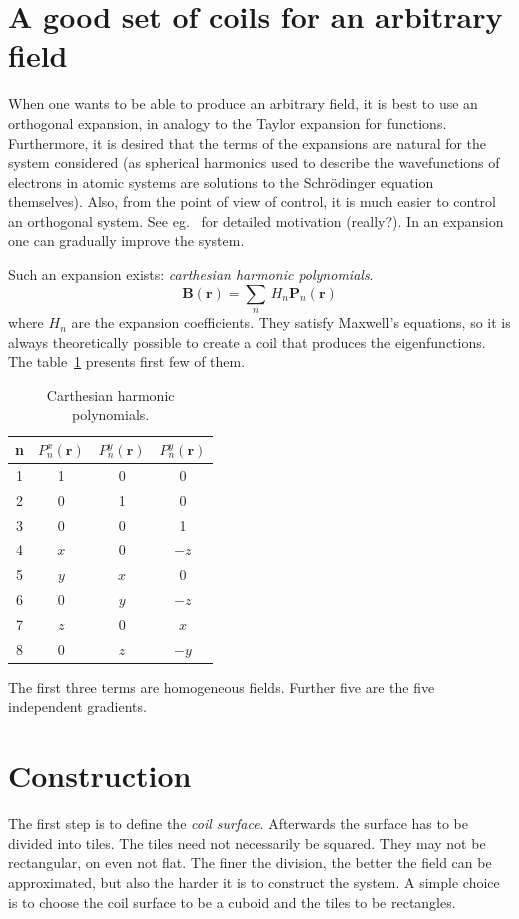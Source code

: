 \section{A good set of coils for an arbitrary field}
When one wants to be able to produce an arbitrary field, it is best to use an orthogonal expansion, in analogy to the Taylor expansion for functions. Furthermore, it is desired that the terms of the expansions are natural for the system considered (as spherical harmonics used to describe the wavefunctions of electrons in atomic systems are solutions to the Schrödinger equation themselves). Also, from the point of view of control, it is much easier to control an orthogonal system. See eg. \,\citep{Branch1984} for detailed motivation (really?). In an expansion one can gradually improve the system.

Such an expansion exists: \emph{carthesian harmonic polynomials}.
\begin{equation}
  \mathbf{B}(\mathbf{r}) = \sum_{n}\,H_n\mathbf{P}_n(\mathbf{r})
\end{equation}
where $H_n$ are the expansion coefficients. They satisfy Maxwell's equations, so it is always theoretically possible to create a coil that produces the eigenfunctions. The table~\ref{tab:coils_carthesian_harmonics} presents first few of them.

\begin{table}
  \centering
  \begin{tabular}{c|ccc}
    n & $P_n^x(\mathbf{r})$ & $P_n^y(\mathbf{r})$ & $P_n^y(\mathbf{r})$ \\ \hline
    1 & 1 & 0 & 0 \\
    2 & 0 & 1 & 0 \\
    3 & 0 & 0 & 1 \\ \hline
    4 & $x$ &  0  & $-z$ \\
    5 & $y$ & $x$ &   0  \\
    6 &  0  & $y$ & $-z$ \\
    7 & $z$ &  0  & $ x$ \\
    8 &  0  & $z$ & $-y$ \\
  \end{tabular}
  \label{tab:coils_carthesian_harmonics}
  \caption{Carthesian harmonic polynomials.}
\end{table}

The first three terms are homogeneous fields. Further five are the five independent gradients.


\section{Construction}
The first step is to define the \emph{coil surface}. Afterwards the surface has to be divided into tiles. The tiles need not necessarily be squared. They may not be rectangular, on even not flat. The finer the division, the better the field can be approximated, but also the harder it is to construct the system. A simple choice is to choose the coil surface to be a cuboid and the tiles to be rectangles.



